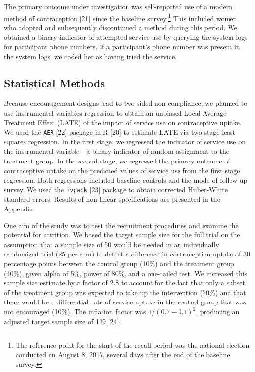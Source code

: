 \documentclass[man]{apa6}
\theoremstyle{definition}
\theoremstyle{definition}
\theoremstyle{definition}
\theoremstyle{remark}
\begin{document}
The primary outcome under investigation was self-reported use of a
modern method of contraception {[}21{]} since the baseline
survey.\footnote{The reference point for the start of the recall period
  was the national election conducted on August 8, 2017, several days
  after the end of the baseline survey.} This included women who adopted
and subsequently discontinued a method during this period. We obtained a
binary indicator of attempted service use by querying the system logs
for participant phone numbers. If a participant's phone number was
present in the system logs, we coded her as having tried the service.

\hypertarget{statistical-methods}{%
\subsection{Statistical Methods}\label{statistical-methods}}

Because encouragement designs lead to two-sided non-compliance, we
planned to use instrumental variables regression to obtain an unbiased
Local Average Treatment Effect (LATE) of the impact of service use on
contraceptive uptake. We used the \texttt{AER} {[}22{]} package in R
{[}20{]} to estimate LATE via two-stage least squares regression. In the
first stage, we regressed the indicator of service use on the
instrumental variable---a binary indicator of random assignment to the
treatment group. In the second stage, we regressed the primary outcome
of contraceptive uptake on the predicted values of service use from the
first stage regression. Both regressions included baseline controls and
the mode of follow-up survey. We used the \texttt{ivpack} {[}23{]}
package to obtain corrected Huber-White standard errors. Results of
non-linear specifications are presented in the Appendix.

One aim of the study was to test the recruitment procedures and examine
the potential for attrition. We based the target sample size for the
full trial on the assumption that a sample size of 50 would be needed in
an individually randomized trial (25 per arm) to detect a difference in
contraception uptake of 30 percentage points between the control group
(10\%) and the treatment group (40\%), given alpha of 5\%, power of
80\%, and a one-tailed test. We increased this sample size estimate by a
factor of 2.8 to account for the fact that only a subset of the
treatment group was expected to take up the intervention (70\%) and that
there would be a differential rate of service uptake in the control
group that was not encouraged (10\%). The inflation factor was
\(1/(0.7-0.1)^2\), producing an adjusted target sample size of 139
{[}24{]}.
\end{document}
